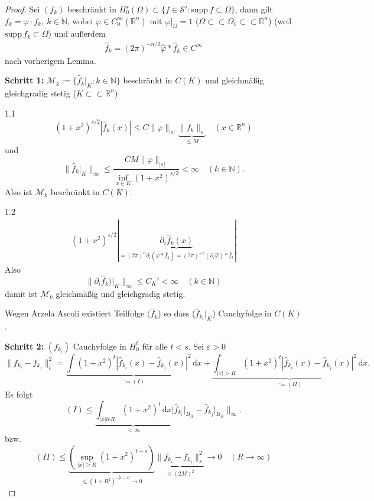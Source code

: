 \documentclass[
paper=a4,
bibtotocnumbered,
liststotocnumbered,
tablecaptionabove,
pointlessnumbers,
twoside,
openright,
10pt
]
{report}
\newcommand{\supp}{\mathrm{supp}\,}
\let\phi\varphi
\theoremstyle{definition}
\numberwithin{equation}{chapter}
\begin{document}
\begin{proof}
Sei $(f_k)$ beschränkt in $H_0^s(\Omega) \subset \{f\in \mathcal S': \supp f\subset \overline \Omega \}$, dann gilt $f_k=\phi \cdot f_k, \ k\in \mathbb N$, wobei $\phi \in C_0^\infty(\mathbb R^n)$ mit $\phi|_{\Omega} =1$ ($\Omega \subset \subset \Omega_1 \subset \subset \mathbb R^n$) (weil $\supp f_k \subset \overline \Omega$)
und außerdem
\begin{gather}
\hat f_k = (2\pi)^{-n/2} \hat \phi * \hat f_k \in C^\infty
\end{gather}
nach vorherigem Lemma.

\textbf{Schritt 1:} $\mathcal M_k:= \{\hat f_k\big |_K : k\in \mathbb N\}$ beschränkt in $C(K)$ und gleichmäßig gleichgradig stetig ($K\subset \subset \mathbb R^n$)

1.1
\begin{equation}
(1+x^2)^{s/2} | \hat f_k(x)| \le C \| \phi\|_{|s|} \underbrace{\| f_k\|_s}_{\le M} \quad (x\in \mathbb R^n)
\end{equation}
und $$\| \hat f_k\big |_K\|_\infty \le \frac{CM\|\phi\|_{|s|}}{\inf_{x\in K} (1+x^2)^{s/2}} <\infty \quad (k\in \mathbb N).$$
Also ist $\mathcal M_k$ beschränkt in $C(K)$.

1.2 
\begin{gather}
(1+x^2)^{s/2} |\underbrace{\partial_i \hat f_k(x)}_{= (2\pi)^{n} \partial_i(\hat \phi * \hat f_k)=(2\pi)^{-n} (\partial_i \hat \phi) * \hat f_k}|
\end{gather}
Also
\begin{equation}
\|\partial_i \hat f_k)\big |_K \|_\infty \le C_K' <\infty \quad (k\in \mathbb N)
\end{equation}
damit ist $\mathcal M_k$ gleichmäßig und gleichgradig stetig.

Wegen Arzela Ascoli existiert Teilfolge $(\hat f_k$) so dass ($\hat f_{k_i}\big |_K$) Cauchyfolge in $C(K)$.

\textbf{Schritt 2:} $(f_{k_i})$ Cauchyfolge in $H_0^t$ für alle $t<s$. Sei $\varepsilon>0$
\begin{equation}
\|f_{k_i} - f_{k_j}\|_t^2 = \underbrace{\int (1+x^2)^t |\hat f_{k_i}(x) - \hat f_{k_j}(x)|^2\, \mathrm dx}_{:=(I)} + \underbrace{\int_{|x|>R} (1+x^2)^t | \hat f_{k_i}(x) - \hat f_{k_j} (x) |^2\, \mathrm dx}_{:=(II)}.
\end{equation}
Es folgt 
\begin{equation}
(I) \le \underbrace{\int_{|x|le R} (1+x^2)^t\, \mathrm dx}_{<\infty} | \hat f_{k_i}\big |_{B_R} - \hat f_{k_j}\big |_{B_R} \|_\infty.
\end{equation}
bzw.
\begin{equation}
(II) \le \underbrace{(\sup_{|x|\ge R} (1+x^2)^{t-s} )}_{\le (1+R^2)^{-|t-s|} \to 0} \underbrace{\| f_{k_i} - f_{k_j}\|_s^2}_{\le (2M)^2} \to 0 \quad (R\to \infty)
\end{equation}
\end{proof}
\end{document}
